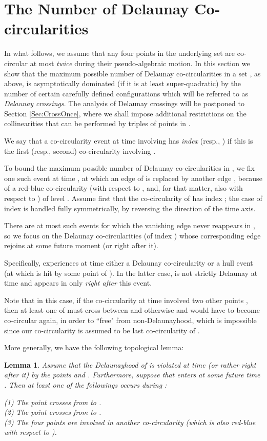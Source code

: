 \documentclass[letter,11pt]{article}
\newtheorem{lemma}[theorem]{Lemma}
\begin{document}
\section{The Number of Delaunay Co-circularities}\label{Sec:DelCocircs}
In what follows, 
we assume that any four points in the underlying set  are co-circular at most {\it twice} during their pseudo-algebraic motion. 
In this section we show that the maximum possible number  of Delaunay co-circularities in a set , as above, is asymptotically dominated (if it is at least super-quadratic) by
the number of certain carefully defined configurations which will be referred to as {\it Delaunay crossings}. The analysis of Delaunay crossings will be postponed to Section \ref{Sec:CrossOnce}, where we shall impose additional restrictions on the collinearities that can be performed by triples of points in .

\smallskip
{} We say that a co-circularity event at time  involving  has {\it index}  (resp., ) if this is the first (resp., second) co-circularity involving . 

\smallskip
To bound the maximum possible number of Delaunay co-circularities in , we fix one such event at time , at which an edge  of  is replaced by another edge , because of a red-blue co-circularity (with respect to , and, for that matter, also with respect to ) of level .
Assume first that the co-circularity of  has index ; the case of index  is handled fully symmetrically, by reversing the direction of the time axis.
 
There are at most  such events for which the vanishing edge  never reappears in , so we focus on the Delaunay co-circularities (of index ) whose corresponding edge  rejoins  at some future moment  (or right after it).

Specifically,  experiences at time  either a Delaunay co-circularity or a hull event (at which  is hit by some point of ). In the latter case,  is not strictly Delaunay at time  and appears in  only {\it right after} this event. 

Note that in this case, if the co-circularity at time  involved two other points , then at least one of  must cross  between  and  otherwise  and  would have to become co-circular again, in order to ``free"  from non-Delaunayhood, which is impossible since our co-circularity is assumed to be {last} co-circularity of .

More generally, we have the following topological lemma:
\begin{lemma}\label{Lemma:MustCross}
Assume that the Delaunayhood of  is violated at time  (or rather right after it) by the points  and . 
Furthermore, suppose that  enters  at some future time .
Then at least one of the followings occurs during : 

\medskip
(1) The point  crosses  from  to .\\
\indent(2) The point  crosses  from  to .\\
\indent(3) The four points  are involved in another co-circularity (which is also red-blue with respect to ). \end{lemma}
\end{document}

